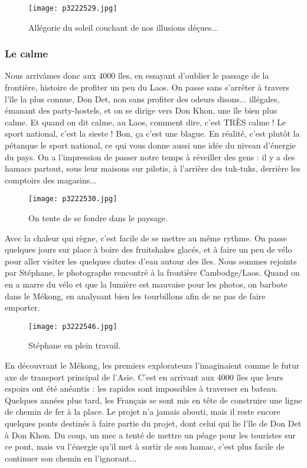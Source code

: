 \documentclass{book}
\begin{document}
\begin{figure}[h]
\centering
\texttt{[image: p3222529.jpg]}
\caption*{Allégorie du soleil couchant de nos illusions déçues...}
\end{figure}
\subsubsection{Le calme}
Nous arrivâmes donc aux 4000 îles, en essayant d'oublier le passage de la frontière, histoire de profiter un peu du Laos. On passe sans s'arrêter à travers l'île la plus connue, Don Det, non sans profiter des odeurs disons... illégales, émanant des party-hostels, et on se dirige vers Don Khon, une île bien plus calme. Et quand on dit calme, au Laos, comment dire, c'est TRÈS calme ! Le sport national, c'est la sieste ! Bon, ça c'est une blague. En réalité, c'est plutôt la pétanque le sport national, ce qui vous donne aussi une idée du niveau d'énergie du pays. On a l'impression de passer notre temps à réveiller des gens : il y a des hamacs partout, sous leur maisons sur pilotis, à l'arrière des tuk-tuks, derrière les comptoirs des magasins...


\begin{figure}[h]
\centering
\texttt{[image: p3222530.jpg]}
\caption*{On tente de se fondre dans le paysage.}
\end{figure}

Avec la chaleur qui règne, c'est facile de se mettre au même rythme. On passe quelques jours sur place à boire des fruitshakes glacés, et à faire un peu de vélo pour aller visiter les quelques chutes d'eau autour des îles. Nous sommes rejoints par Stéphane, le photographe rencontré à la frontière Cambodge/Laos. Quand on en a marre du vélo et que la lumière est mauvaise pour les photos, on barbote dans le Mékong, en analysant bien les tourbillons afin de ne pas de faire emporter.


\begin{figure}[h]
\centering
\texttt{[image: p3222546.jpg]}
\caption*{Stéphane en plein travail.}
\end{figure}

En découvrant le Mékong, les premiers explorateurs l'imaginaient comme le futur axe de transport principal de l'Asie. C'est en arrivant aux 4000 îles que leurs espoirs ont été anéantis : les rapides sont impossibles à traverser en bateau. Quelques années plus tard, les Français se sont mis en tête de construire une ligne de chemin de fer à la place. Le projet n'a jamais abouti, mais il reste encore quelques ponts destinés à faire partie du projet, dont celui qui lie l'île de Don Det à Don Khon. Du coup, un mec a tenté de mettre un péage pour les touristes sur ce pont, mais vu l’énergie qu'il met à sortir de son hamac, c'est plus facile de continuer son chemin en l'ignorant...
\end{document}
